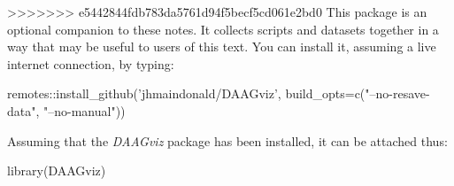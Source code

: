 >>>>>>> e5442844fdb783da5761d94f5becf5cd061e2bd0
This package is an optional companion to these notes. 
It collects scripts and datasets together in a way that may be
useful to users of this text.  
You can install it, assuming a live internet connection,
by typing:

\begin{fullwidth}

\begin{Schunk}
\begin{Sinput}
remotes::install_github('jhmaindonald/DAAGviz',
                        build_opts=c("--no-resave-data", 
                                     "--no-manual"))
\end{Sinput}
\end{Schunk}

\end{fullwidth}

Assuming that the {\em DAAGviz} package has been installed, it can be attached thus:
\begin{Schunk}
\begin{Sinput}
library(DAAGviz)
\end{Sinput}
\end{Schunk}

